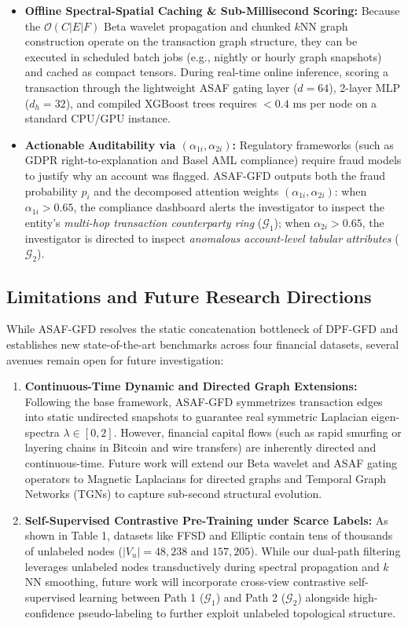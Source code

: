 \documentclass[10pt,a4paper,twocolumn]{article}
\begin{document}
\begin{itemize}
  \item \textbf{Offline Spectral-Spatial Caching \& Sub-Millisecond Scoring:} Because the $\mathscr{O}(C|E|F)$ Beta wavelet propagation and chunked $k$NN graph construction operate on the transaction graph structure, they can be executed in scheduled batch jobs (e.g., nightly or hourly graph snapshots) and cached as compact tensors. During real-time online inference, scoring a transaction through the lightweight ASAF gating layer ($d = 64$), 2-layer MLP ($d_h = 32$), and compiled XGBoost trees requires $< 0.4\text{ ms}$ per node on a standard CPU/GPU instance.
  \item \textbf{Actionable Auditability via $(\alpha_{1i}, \alpha_{2i})$:} Regulatory frameworks (such as GDPR right-to-explanation and Basel AML compliance) require fraud models to justify why an account was flagged. ASAF-GFD outputs both the fraud probability $p_i$ and the decomposed attention weights $(\alpha_{1i}, \alpha_{2i})$: when $\alpha_{1i} > 0.65$, the compliance dashboard alerts the investigator to inspect the entity's \textit{multi-hop transaction counterparty ring} ($\mathscr{G}_1$); when $\alpha_{2i} > 0.65$, the investigator is directed to inspect \textit{anomalous account-level tabular attributes} ($\mathscr{G}_2$).
\end{itemize}

\subsection{Limitations and Future Research Directions}

While ASAF-GFD resolves the static concatenation bottleneck of DPF-GFD and establishes new state-of-the-art benchmarks across four financial datasets, several avenues remain open for future investigation:

\begin{enumerate}
  \item \textbf{Continuous-Time Dynamic and Directed Graph Extensions:} Following the base framework, ASAF-GFD symmetrizes transaction edges into static undirected snapshots to guarantee real symmetric Laplacian eigen-spectra $\lambda \in [0, 2]$. However, financial capital flows (such as rapid smurfing or layering chains in Bitcoin and wire transfers) are inherently directed and continuous-time. Future work will extend our Beta wavelet and ASAF gating operators to Magnetic Laplacians for directed graphs and Temporal Graph Networks (TGNs) to capture sub-second structural evolution.
  \item \textbf{Self-Supervised Contrastive Pre-Training under Scarce Labels:} As shown in Table 1, datasets like FFSD and Elliptic contain tens of thousands of unlabeled nodes ($|V_u| = 48,238$ and $157,205$). While our dual-path filtering leverages unlabeled nodes transductively during spectral propagation and $k$NN smoothing, future work will incorporate cross-view contrastive self-supervised learning between Path 1 ($\mathscr{G}_1$) and Path 2 ($\mathscr{G}_2$) alongside high-confidence pseudo-labeling to further exploit unlabeled topological structure.
\end{enumerate}
\end{document}
